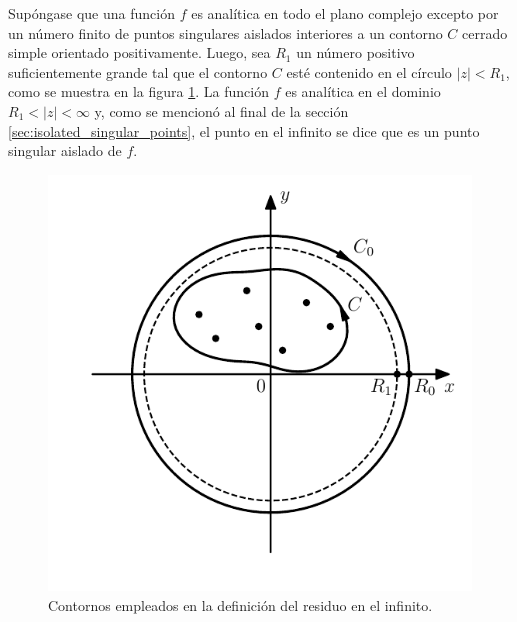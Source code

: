 \documentclass[a4paper]{report}
\begin{document}
Supóngase que una función \(f\) es analítica en todo el plano complejo excepto por un número finito de puntos singulares aislados interiores a un contorno \(C\) cerrado simple orientado positivamente. Luego, sea \(R_1\) un número positivo suficientemente grande tal que el contorno \(C\) esté contenido en el círculo \(|z|<R_1\), como se muestra en la figura \ref{fig:residue_at_infinity}. La función \(f\) es analítica en el dominio \(R_1<|z|<\infty\) y, como se mencionó al final de la sección \ref{sec:isolated_singular_points}, el punto en el infinito se dice que es un punto singular aislado de \(f\).
\begin{figure}[!htb]
  \begin{minipage}[c]{0.5\textwidth}
    \includegraphics[width=\textwidth]{figuras/residue_at_infinity.pdf}
  \end{minipage}\hfill
  \begin{minipage}[c]{0.4\textwidth}
    \caption{
       Contornos empleados en la definición del residuo en el infinito.
    }\label{fig:residue_at_infinity}
  \end{minipage}
\end{figure}
\end{document}
